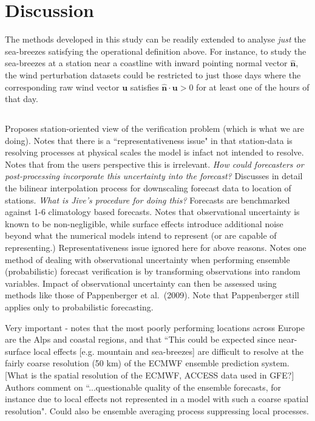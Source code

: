 \documentclass[alpha-refs]{wiley-article}
\begin{document}
\section{Discussion}
\label{discussion}

The methods developed in this study can be readily extended to analyse \emph{just} the sea-breezes satisfying the operational definition above. For instance, to study the sea-breezes at a station near a coastline with inward pointing normal vector $\widehat{\boldsymbol{n}}$, the wind perturbation datasets could be restricted to just those days where the corresponding raw wind vector $\boldsymbol{u}$ satisfies $\widehat{\boldsymbol{n}} \cdot \boldsymbol{u} > 0$ for at least one of the hours of that day.

\subsection{\citet{pinson12}}
Proposes station-oriented view of the verification problem (which is what we are doing). Notes that there is a ``representativeness issue" in that station-data is resolving processes at physical scales the model is infact not intended to resolve. Notes that from the users perspective this is irrelevant. \textit{How could forecasters or post-processing incorporate this uncertainty into the forecast?} Discusses in detail the bilinear interpolation process for downscaling forecast data to location of stations. \textit{What is Jive's procedure for doing this?} Forecasts are benchmarked against 1-6 climatology based forecasts. Notes that observational uncertainty is known to be non-negligible, while surface effects introduce additional noise beyond what the numerical models intend to represent (or are capable of representing.) Representativeness issue ignored here for above reasons. Notes one method of dealing with observational uncertainty when performing ensemble (probabilistic) forecast verification is by transforming observations into random variables. Impact of observational uncertainty can then be assessed using methods like those of Pappenberger et al.~(2009). Note that Pappenberger still applies only to probabilistic forecasting. 

Very important - notes that the most poorly performing locations across Europe are the Alps and coastal regions, and that ``This could be expected since near-surface local effects [e.g. mountain and sea-breezes] are difficult to resolve at the fairly coarse resolution (50 km) of the ECMWF ensemble prediction system. [What is the spatial resolution of the ECMWF, ACCESS data used in GFE?] Authors comment on ``...questionable quality of the ensemble forecasts, for instance due to local effects not represented in a model with such a coarse spatial resolution". Could also be ensemble averaging process suppressing local processes.    
\end{document}
